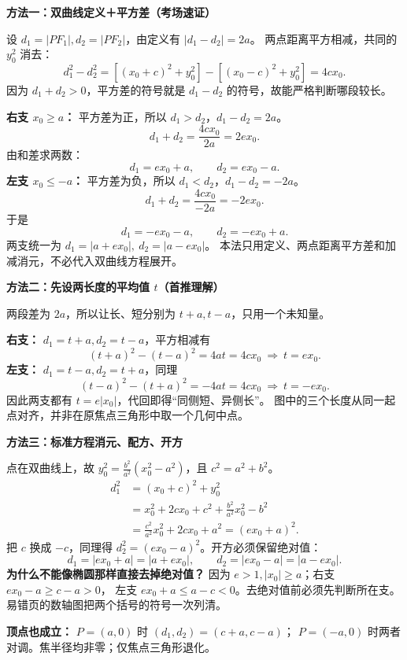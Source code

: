 \clearpage
\begin{proofbox}
\textbf{\textcolor{CProof}{方法一：双曲线定义＋平方差（考场速证）}}

设 $d_1=|PF_1|,d_2=|PF_2|$，由定义有 $|d_1-d_2|=2a$。
两点距离平方相减，共同的 $y_0^2$ 消去：
\[
d_1^2-d_2^2=[(x_0+c)^2+y_0^2]-[(x_0-c)^2+y_0^2]=4cx_0.
\]
因为 $d_1+d_2>0$，平方差的符号就是 $d_1-d_2$ 的符号，故能严格判断哪段较长。

\textbf{右支 $x_0\ge a$：} 平方差为正，所以 $d_1>d_2$，$d_1-d_2=2a$。
\[
d_1+d_2=\frac{4cx_0}{2a}=2ex_0.
\]
由和差求两数：
\[
\boxed{d_1=ex_0+a},\qquad\boxed{d_2=ex_0-a}.
\]
\textbf{左支 $x_0\le-a$：} 平方差为负，所以 $d_1<d_2$，$d_1-d_2=-2a$。
\[
d_1+d_2=\frac{4cx_0}{-2a}=-2ex_0.
\]
于是
\[
\boxed{d_1=-ex_0-a},\qquad\boxed{d_2=-ex_0+a}.
\]
两支统一为 $\boxed{d_1=|a+ex_0|,\ d_2=|a-ex_0|}$。
本法只用定义、两点距离平方差和加减消元，不必代入双曲线方程展开。
\end{proofbox}
\clearpage
\begin{proofbox}
\textbf{\textcolor{CProof}{方法二：先设两长度的平均值 $t$（首推理解）}}

两段差为 $2a$，所以让长、短分别为 $t+a,t-a$，只用一个未知量。

\textbf{右支：} $d_1=t+a,d_2=t-a$，平方相减有
\[
(t+a)^2-(t-a)^2=4at=4cx_0\ \Longrightarrow\ t=ex_0.
\]
\textbf{左支：} $d_1=t-a,d_2=t+a$，同理
\[
(t-a)^2-(t+a)^2=-4at=4cx_0\ \Longrightarrow\ t=-ex_0.
\]
因此两支都有 $t=e|x_0|$，代回即得“同侧短、异侧长”。
图中的三个长度从同一起点对齐，并非在原焦点三角形中取一个几何中点。
\end{proofbox}
\clearpage
\begin{proofbox}
\textbf{\textcolor{CProof}{方法三：标准方程消元、配方、开方}}

点在双曲线上，故 $y_0^2=\frac{b^2}{a^2}(x_0^2-a^2)$，且 $c^2=a^2+b^2$。
\[
\begin{aligned}
d_1^2&=(x_0+c)^2+y_0^2\\
&=x_0^2+2cx_0+c^2+\frac{b^2}{a^2}x_0^2-b^2\\
&=\frac{c^2}{a^2}x_0^2+2cx_0+a^2=(ex_0+a)^2.
\end{aligned}
\]
把 $c$ 换成 $-c$，同理得 $d_2^2=(ex_0-a)^2$。开方必须保留绝对值：
\[
\boxed{d_1=|ex_0+a|=|a+ex_0|},\qquad
\boxed{d_2=|ex_0-a|=|a-ex_0|}.
\]
\textbf{为什么不能像椭圆那样直接去掉绝对值？}
因为 $e>1,|x_0|\ge a$；右支 $ex_0-a\ge c-a>0$，
左支 $ex_0+a\le a-c<0$。去绝对值前必须先判断所在支。
易错页的数轴图把两个括号的符号一次列清。

\textbf{顶点也成立：} $P=(a,0)$ 时 $(d_1,d_2)=(c+a,c-a)$；
$P=(-a,0)$ 时两者对调。焦半径均非零；仅焦点三角形退化。
\end{proofbox}

